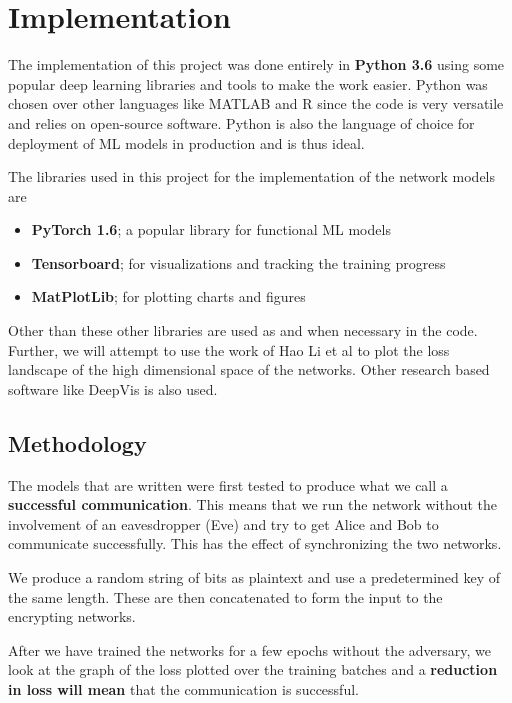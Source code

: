 \documentclass[a4paper]{article}
\begin{document}
  \newpage 
  \section{Implementation} \label{sec:implementation}
  The implementation of this project was done entirely in {\bfseries Python 3.6} using some popular 
  deep learning libraries and tools to make the work easier. Python was chosen over other languages
  like MATLAB and R since the code is very versatile and relies on open-source software.
  Python is also the language of choice for deployment of ML models in production and is thus ideal.

  The libraries used in this project for the implementation of the network models are
  \begin{itemize}
    \item {\bfseries PyTorch 1.6}; a popular library for functional ML models
    \item {\bfseries Tensorboard}; for visualizations and tracking the training progress
    \item {\bfseries MatPlotLib}; for plotting charts and figures
  \end{itemize}

  Other than these other libraries are used as and when necessary in the code. Further, we will 
  attempt to use the work of Hao Li et al\cite{visualloss} to plot the loss landscape of the 
  high dimensional space of the networks. Other research based 
  software like DeepVis\cite{deepvis} is also used.

    \subsection{Methodology}
    The models that are written were first tested to produce what we call a \\
    {\bfseries successful communication}.
    This means that we run the network without the involvement of an eavesdropper (Eve) and try to
    get Alice and Bob to communicate successfully. This has the effect of synchronizing the two networks.

    We produce a random string of bits as plaintext and use a predetermined key of the same length. 
    These are then concatenated to form the input to the encrypting networks.

    After we have trained the networks for a few epochs without the adversary, we look at the graph
    of the loss plotted over the training batches and a {\bfseries reduction in loss will mean} that
    the communication is successful.
\end{document}
